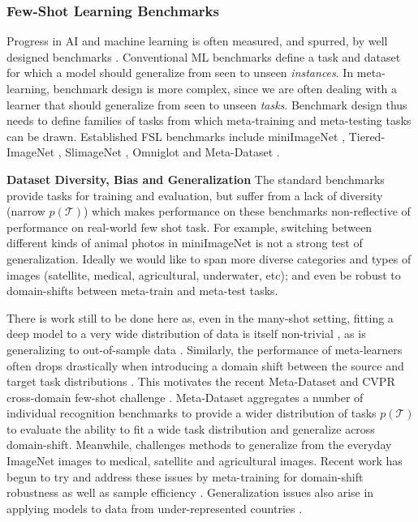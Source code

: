 \documentclass[10pt,journal,compsoc]{IEEEtran}
\newcommand{\keypoint}[1]{\vspace{0.1cm}\noindent\textbf{#1}\quad}
\begin{document}
\subsubsection{Few-Shot Learning Benchmarks}\label{sec:ClassificationBenchmarks}
Progress in AI and machine learning is often measured, and spurred, by well designed benchmarks \cite{russakovsky2015imagenet}. Conventional ML benchmarks define a task and dataset for which a model should generalize from seen to unseen \emph{instances}. 
In meta-learning, benchmark design is more complex, since we are often dealing with a learner that should generalize from seen to unseen \emph{tasks}. Benchmark design thus needs to define families of tasks from which meta-training and meta-testing tasks can be drawn. Established FSL benchmarks include miniImageNet \cite{vinyals2016matching,ravi2016optimization}, Tiered-ImageNet \cite{ren2018meta}, SlimageNet \cite{antoniou2020defining}, Omniglot \cite{vinyals2016matching} and Meta-Dataset \cite{triantafillou2019metadataset}. 

\keypoint{Dataset Diversity, Bias and Generalization} The standard benchmarks provide   tasks for training and evaluation, but suffer from a lack of diversity (narrow $p(\mathcal{T})$) which makes performance on these benchmarks non-reflective of performance on real-world few shot task. For example, switching between different kinds of animal photos in miniImageNet is not a strong test of generalization. Ideally we would like to span more diverse categories and types of images (satellite, medical, agricultural, underwater, etc); and even be robust to domain-shifts between meta-train and meta-test tasks.

There is work still to be done here as, even in the many-shot setting, fitting a deep model to a very wide distribution of data is itself non-trivial \cite{rebuff2017mdl}, as is generalizing to out-of-sample data \cite{li2019featurecritic,balaji2018metareg}. Similarly, the performance of meta-learners often drops drastically when introducing a domain shift between the source and target task distributions \cite{chen2019closerfewshot}. This motivates the recent Meta-Dataset \cite{triantafillou2019metadataset} and CVPR cross-domain few-shot challenge \cite{guo2019new}. Meta-Dataset aggregates a number of individual recognition benchmarks to provide a wider distribution of tasks $p(\mathcal{T})$ to evaluate the ability to fit a wide task distribution and generalize across domain-shift. Meanwhile, \cite{guo2019new} challenges methods to generalize from the everyday ImageNet images to medical, satellite and agricultural images. Recent work has begun to try and address these issues by meta-training for domain-shift robustness as well as sample efficiency \cite{tseng2020crossdomain}. Generalization issues also arise in applying models to data from under-represented countries \cite{de2019does}.  
\end{document}
